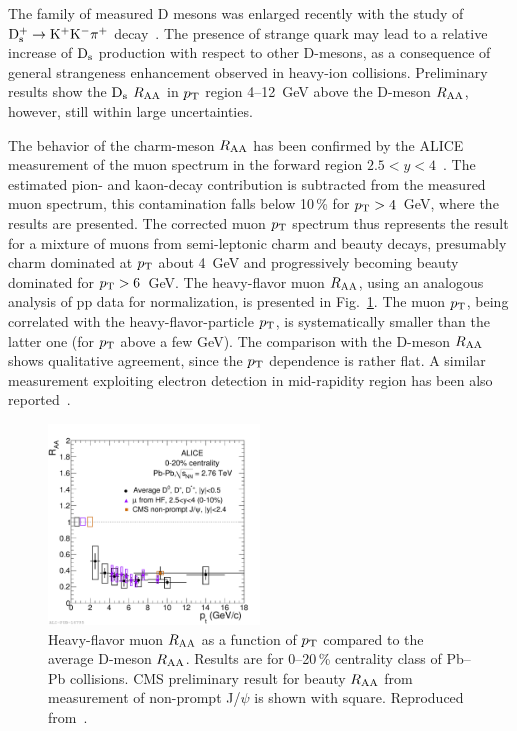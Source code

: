 The family of measured D mesons was enlarged recently with the study of ${\rm D}_{\rm s}^+ \rightarrow {\rm K}^+{\rm K}^-\pi^+$ decay~\cite{Abelev:2012tca}. The presence of strange quark may lead to a relative increase of ${\rm D}_{\rm s}$ production with respect to other D-mesons, as a consequence of general strangeness enhancement observed in heavy-ion collisions. Preliminary results show the ${\rm D}_{\rm s}$ $R_{\rm AA}$ in $p_{\rm T}$ region 4--12~GeV above the D-meson $R_{\rm AA}$, however, still within large uncertainties.

The behavior of the charm-meson $R_{\rm AA}$ has been confirmed by the ALICE measurement of the muon spectrum in the forward region $2.5 < y < 4$~\cite{Abelev:2012qh}. The estimated pion- and kaon-decay contribution is subtracted from the measured muon spectrum, this contamination falls below 10\,\% for $p_{\rm T} > 4$~GeV, where the results are presented. The corrected muon $p_{\rm T}$ spectrum thus represents the result for a mixture of muons from semi-leptonic charm and beauty decays, presumably charm dominated at $p_{\rm T}$ about 4~GeV and progressively becoming beauty dominated for $p_{\rm T} > 6$~GeV. The heavy-flavor muon $R_{\rm AA}$, using an analogous analysis of pp data for normalization, is presented in Fig.~\ref{figks:HFmuonRAA}. The muon $p_{\rm T}$, being correlated with the heavy-flavor-particle $p_{\rm T}$, is systematically smaller than the latter one (for $p_{\rm T}$ above a few GeV). The comparison with the D-meson $R_{\rm AA}$ shows qualitative agreement, since the $p_{\rm T}$ dependence is rather flat. A similar measurement exploiting electron detection in mid-rapidity region has been also reported~\cite{Abelev:2012xe}.

\begin{figure}
\centering
\includegraphics[width=0.5\textwidth]{heavyflavorfigs/DmesonHFmuonBRAA.pdf}
\caption{Heavy-flavor muon $R_{\rm AA}$ as a function of $p_{\rm T}$ compared to the average D-meson $R_{\rm AA}$. Results are for 0--20\,\% centrality class of Pb--Pb collisions. CMS preliminary result for beauty $R_{\rm AA}$ from measurement of non-prompt J/$\psi$ is shown with square. Reproduced from~\cite{Abelev:2012qh}.}
\label{figks:HFmuonRAA}
\end{figure}

